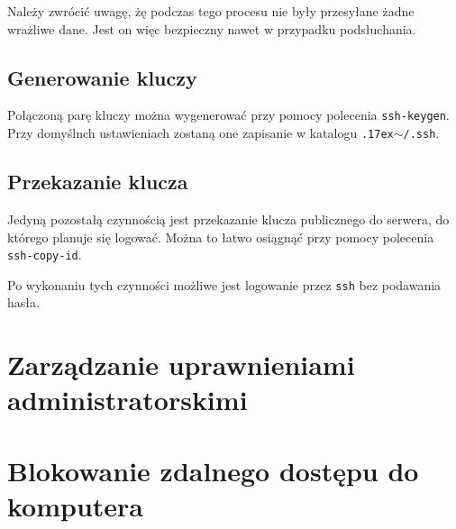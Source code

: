 \documentclass{article}
\begin{document}
Należy zwrócić uwagę, żę podczas tego procesu nie były przesyłane żadne wrażliwe dane. Jest on więc bezpieczny nawet w przypadku podsłuchania.

\subsection{Generowanie kluczy}
Połączoną parę kluczy można wygenerować przy pomocy polecenia \texttt{ssh-keygen}. Przy domyślnch ustawieniach zostaną one zapisanie w katalogu \texttt{{\raise.17ex\hbox{$\scriptstyle\sim$}}/.ssh}.

\subsection{Przekazanie klucza}
Jedyną pozostałą czynnością jest przekazanie klucza publicznego do serwera, do którego planuje się logować. Można to łatwo osiągnąć przy pomocy polecenia \texttt{ssh-copy-id}.

Po wykonaniu tych czynności możliwe jest logowanie przez \texttt{ssh} bez podawania hasła.

\section{Zarządzanie uprawnieniami administratorskimi}

\section{Blokowanie zdalnego dostępu do komputera}
\end{document}
